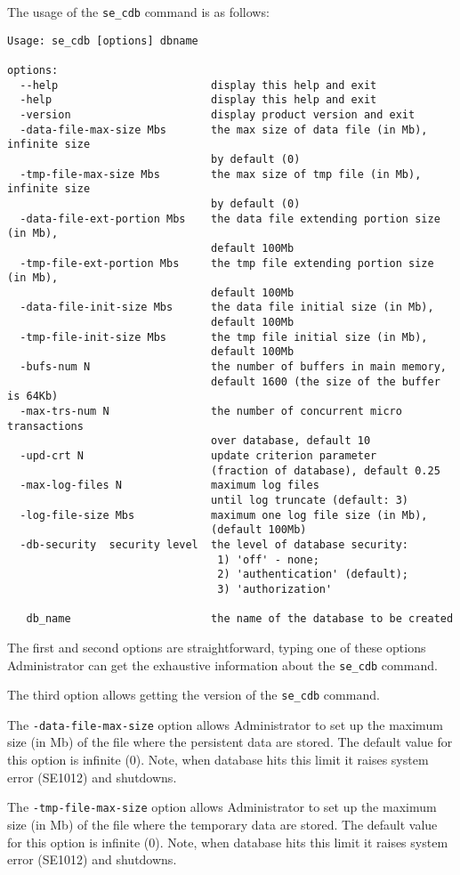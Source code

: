 \documentclass[a4paper,12pt]{article}
\begin{document}
The usage of the \verb!se_cdb! command is as follows:

\begin{verbatim}
Usage: se_cdb [options] dbname

options:
  --help		 				display this help and exit
  -help							display this help and exit
  -version						display product version and exit
  -data-file-max-size Mbs		the max size of data file (in Mb), infinite size
								by default (0)
  -tmp-file-max-size Mbs		the max size of tmp file (in Mb), infinite size
								by default (0)
  -data-file-ext-portion Mbs	the data file extending portion size (in Mb),
								default 100Mb
  -tmp-file-ext-portion Mbs		the tmp file extending portion size (in Mb),
								default 100Mb
  -data-file-init-size Mbs		the data file initial size (in Mb),
								default 100Mb
  -tmp-file-init-size Mbs		the tmp file initial size (in Mb),
								default 100Mb
  -bufs-num N					the number of buffers in main memory,
								default 1600 (the size of the buffer is 64Kb)
  -max-trs-num N				the number of concurrent micro transactions
								over database, default 10
  -upd-crt N					update criterion parameter
								(fraction of database), default 0.25
  -max-log-files N              maximum log files
                                until log truncate (default: 3)
  -log-file-size Mbs            maximum one log file size (in Mb),
                                (default 100Mb)
  -db-security  security level  the level of database security:
								 1) 'off' - none;
								 2) 'authentication' (default);
								 3) 'authorization'

   db_name   					the name of the database to be created
\end{verbatim}


The first and second options are straightforward, typing one of these options Administrator can get the exhaustive information about the \verb!se_cdb! command.

The third option allows getting the version of the \verb!se_cdb! command.

The \verb!-data-file-max-size! option allows Administrator to set up the maximum size (in Mb) of the file where the persistent data are stored. The default value for this option is infinite (0). 
Note, when database hits this limit it raises system error (SE1012) and shutdowns.

The \verb!-tmp-file-max-size! option allows Administrator to set up the maximum size (in Mb) of the file where the temporary data are stored. The default value for this option is infinite (0).
Note, when database hits this limit it raises system error (SE1012) and shutdowns.
\end{document}
